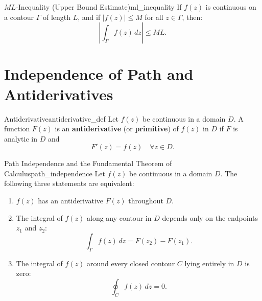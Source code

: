 \begin{theorem}{$ML$-Inequality (Upper Bound Estimate)}{ml_inequality}
If $f(z)$ is continuous on a contour $\Gamma$ of length $L$, and if $|f(z)| \le M$ for all $z \in \Gamma$, then:
\begin{equation}
\left| \int_\Gamma f(z)\, dz \right| \le M L.
\end{equation}
\end{theorem}


\section{Independence of Path and Antiderivatives}

\begin{definition}{Antiderivative}{antiderivative_def}
Let $f(z)$ be continuous in a domain $D$. A function $F(z)$ is an \textbf{antiderivative} (or \textbf{primitive}) of $f(z)$ in $D$ if $F$ is analytic in $D$ and
\begin{equation}
F'(z) = f(z) \quad \forall z \in D.
\end{equation}
\end{definition}

\begin{theorem}{Path Independence and the Fundamental Theorem of Calculus}{path_independence}
Let $f(z)$ be continuous in a domain $D$. The following three statements are equivalent:
\begin{enumerate}
    \item $f(z)$ has an antiderivative $F(z)$ throughout $D$.
    \item The integral of $f(z)$ along any contour in $D$ depends only on the endpoints $z_1$ and $z_2$:
    \begin{equation}
    \int_\Gamma f(z)\, dz = F(z_2) - F(z_1).
    \end{equation}
    \item The integral of $f(z)$ around every closed contour $C$ lying entirely in $D$ is zero:
    \begin{equation}
    \oint_C f(z)\, dz = 0.
    \end{equation}
\end{enumerate}
\end{theorem}

